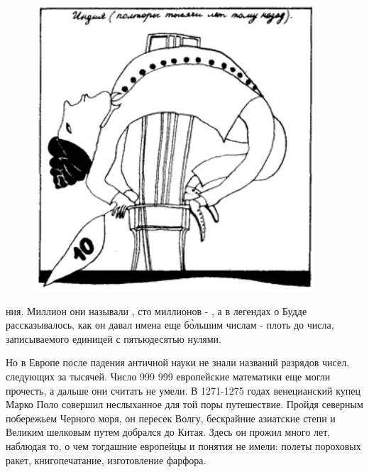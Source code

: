
\changefontsize{12pt}

\pagestyle{fancy}
\fancyhf{}
\renewcommand{\headrulewidth}{0pt} %

\begin{multicols}{2}

\begin{figure}[H]
    \centering
    \includegraphics[width=0.9\linewidth]{kvant_89-lying.png}
    \label{fig:kvant_89-lying}
\end{figure}

\noindent ния. Миллион они называли , сто миллионов - , а в легендах о Будде рассказывалось, как он давал имена еще б\`{о}льшим числам - плоть до числа, записываемого единицей с пятьюдесятью нулями.

Но в Европе после падения античной науки не знали  названий разрядов чисел, следующих за тысячей. Число 999 999 европейские математики еще могли прочесть, а дальше они считать не умели. В 1271-1275 годах венецианский купец Марко Поло совершил неслыханное для той поры путешествие. Пройдя северным побережьем Черного моря, он пересек Волгу, бескрайние азиатские степи и Великим шелковым путем добрался до Китая. Здесь он прожил много лет, наблюдая то, о чем тогдашние европейцы и понятия не имели: полеты пороховых ракет, книгопечатание, изготовление фарфора.


\end{multicols}

